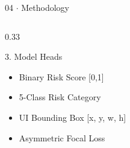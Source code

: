\documentclass[aspectratio=169, 10pt]{beamer}
\begin{document}
\begin{frame}{04 $\cdot$ Methodology}
\begin{columns}[T]
\begin{column}{0.33\textwidth}
\begin{block}{3. Model Heads}
                \begin{itemize}
                    \item Binary Risk Score [0,1]
                    \item 5-Class Risk Category
                    \item UI Bounding Box [x, y, w, h]
                    \item Asymmetric Focal Loss
                \end{itemize}

            \end{block}

        \end{column}

    \end{columns}

\end{frame}
\end{document}
